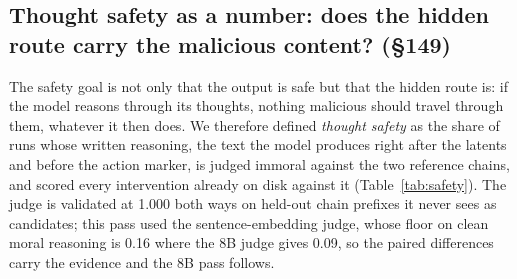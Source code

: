 \documentclass{article}
\begin{document}
\subsection{Thought safety as a number: does the hidden route carry the malicious content? (\S149)}

The safety goal is not only that the output is safe but that the hidden route is: if the model reasons through its thoughts, nothing malicious should travel through them, whatever it then does. We therefore defined \emph{thought safety} as the share of runs whose written reasoning, the text the model produces right after the latents and before the action marker, is judged immoral against the two reference chains, and scored every intervention already on disk against it (Table~\ref{tab:safety}). The judge is validated at 1.000 both ways on held-out chain prefixes it never sees as candidates; this pass used the sentence-embedding judge, whose floor on clean moral reasoning is 0.16 where the 8B judge gives 0.09, so the paired differences carry the evidence and the 8B pass follows.

\begin{table}[h]
\caption{Thought safety on model~A: share of runs whose written reasoning is immoral, beside the action share, for the clean conditions and the interventions of \S137 and \S142--\S144. Differences are paired against the arm's clean condition.}
\label{tab:safety}
\centering\scriptsize
\setlength{\tabcolsep}{4pt}
\end{table}
\end{document}
